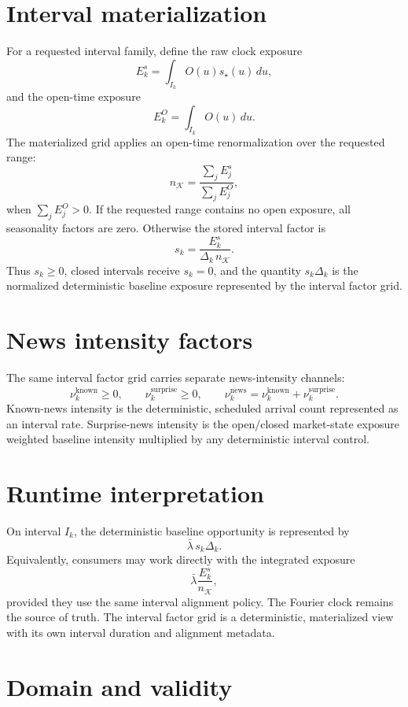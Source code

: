 \documentclass[11pt]{article}
\begin{document}
\section{Interval materialization}

For a requested interval family, define the raw clock exposure
\[
    E_k^{s}
    =
    \int_{I_k}O(u)s_\star(u)\,du,
\]
and the open-time exposure
\[
    E_k^{O}
    =
    \int_{I_k}O(u)\,du.
\]
The materialized grid applies an open-time renormalization over the requested
range:
\[
    n_{\mathcal K}
    =
    \frac{\sum_j E_j^{s}}{\sum_j E_j^{O}},
\]
when \(\sum_jE_j^O>0\).
If the requested range contains no open exposure, all seasonality factors
are zero.
Otherwise the stored interval factor is
\[
    s_k
    =
    \frac{E_k^{s}}{\Delta_k\,n_{\mathcal K}}.
\]
Thus \(s_k\ge0\), closed intervals receive \(s_k=0\), and the quantity
\(s_k\Delta_k\) is the normalized deterministic baseline exposure represented
by the interval factor grid.

\section{News intensity factors}

The same interval factor grid carries separate news-intensity channels:
\[
    \nu_k^{\mathrm{known}}\ge0,
    \qquad
    \nu_k^{\mathrm{surprise}}\ge0,
    \qquad
    \nu_k^{\mathrm{news}}
    =
    \nu_k^{\mathrm{known}}+\nu_k^{\mathrm{surprise}}.
\]
Known-news intensity is the deterministic, scheduled arrival count represented
as an interval rate.
Surprise-news intensity is the open/closed market-state exposure weighted baseline
intensity multiplied by any deterministic interval control.

\section{Runtime interpretation}

On interval \(I_k\), the deterministic baseline opportunity is represented by
\[
    \bar\lambda\,s_k\Delta_k.
\]
Equivalently, consumers may work directly with the integrated exposure
\[
    \bar\lambda
    \frac{E_k^{s}}{n_{\mathcal K}},
\]
provided they use the same interval alignment policy.
The Fourier clock remains the source of truth.
The interval factor grid is a deterministic, materialized view with its own
interval duration and alignment metadata.

\section{Domain and validity}
\end{document}
